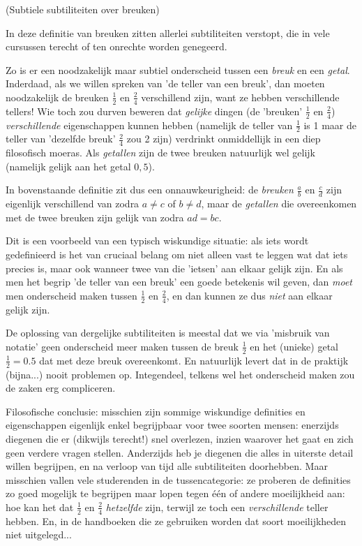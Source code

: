\documentclass[numbers]{ximera}
\begin{document}
\begin{uitweiding} (Subtiele subtiliteiten over breuken)
\begin{expandable}

		In deze definitie van breuken zitten allerlei subtiliteiten verstopt, die in vele cursussen terecht of ten onrechte worden genegeerd. 
		
		Zo is er een noodzakelijk maar subtiel onderscheid tussen een \textit{breuk} en een \textit{getal}. Inderdaad, als we willen spreken van 'de teller van een breuk', dan moeten noodzakelijk de breuken $\frac 12$ en $\frac 24$ verschillend zijn, want ze hebben verschillende tellers! Wie toch zou durven beweren dat \textit{gelijke} dingen (de 'breuken' $\frac 12$ en $\frac 24$)  \textit{verschillende} eigenschappen kunnen hebben (namelijk de teller van $\frac 12$ is 1 maar de teller van 'dezelfde breuk' $\frac24$ zou 2 zijn) verdrinkt onmiddellijk in een diep filosofisch moeras. Als \textit{getallen} zijn de twee breuken natuurlijk wel gelijk (namelijk gelijk aan het getal $0,5$).
		
		In bovenstaande definitie zit dus een onnauwkeurigheid: de \textit{breuken} $\frac ab$ en $\frac cd$ zijn eigenlijk verschillend van zodra $a\neq c$ of $b\neq d$, maar de \textit{getallen} die overeenkomen met de twee breuken zijn gelijk van zodra $ad = bc$.
		
		Dit is een voorbeeld van een typisch wiskundige situatie: als iets wordt gedefinieerd is het van cruciaal belang om niet alleen vast te leggen wat dat iets precies is, maar ook wanneer twee van die 'ietsen' aan elkaar gelijk zijn. En als men het begrip 'de teller van een breuk' een goede betekenis wil geven, dan \textit{moet} men onderscheid maken tussen $\frac 12$ en $\frac 24$, en dan kunnen ze dus \textit{niet} aan elkaar gelijk zijn. 
		
		De oplossing van dergelijke subtiliteiten is meestal dat we via 'misbruik van notatie' geen onderscheid meer maken tussen de breuk $\frac 12$ en het (unieke) getal $\frac 12 = 0.5$ dat met deze breuk overeenkomt. En natuurlijk levert dat in de praktijk (bijna...) nooit problemen op. Integendeel, telkens wel het onderscheid maken zou de zaken erg compliceren. 
		
		Filosofische conclusie: misschien zijn sommige wiskundige definities en eigenschappen eigenlijk enkel begrijpbaar voor twee soorten mensen: enerzijds diegenen die er (dikwijls terecht!) snel overlezen, inzien waarover het gaat en zich geen verdere vragen stellen. Anderzijds heb je diegenen die alles in uiterste detail willen begrijpen, en na verloop van tijd alle subtiliteiten doorhebben. Maar misschien vallen vele studerenden in de tussencategorie: ze proberen de definities zo goed mogelijk te begrijpen maar lopen tegen één of andere moeilijkheid aan: hoe kan het dat $\frac 12$ en $\frac 24$ \textit{hetzelfde} zijn, terwijl ze toch een \textit{verschillende} teller hebben. En, in de handboeken die ze gebruiken worden dat soort moeilijkheden niet uitgelegd...
\end{expandable}
\end{uitweiding}
\end{document}
